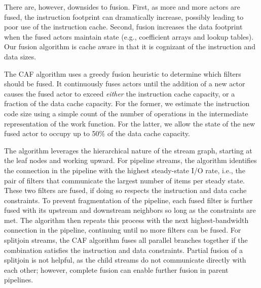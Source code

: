 There are, however, downsides to fusion. First, as more and more
actors are fused, the instruction footprint can dramatically increase,
possibly leading to poor use of the instruction cache. Second, fusion
increases the data footprint when the fused actors maintain state
(e.g., coefficient arrays and lookup tables). Our fusion algorithm is
cache aware in that it is cognizant of the instruction and data sizes.

The CAF algorithm uses a greedy fusion heuristic to determine which
filters should be fused. It continuously fuses actors until the
addition of a new actor causes the fused actor to exceed {\it either}
the instruction cache capacity, or a fraction of the data cache
capacity.  For the former, we estimate the instruction code size using
a simple count of the number of operations in the intermediate
representation of the work function.  For the latter, we allow the
state of the new fused actor to occupy up to 50\% of the data cache
capacity.

The algorithm leverages the hierarchical nature of the stream graph,
starting at the leaf nodes and working upward.  For pipeline streams,
the algorithm identifies the connection in the pipeline with the
highest steady-state I/O rate, i.e., the pair of filters that
communicate the largest number of items per steady state.  These two filters
are fused, if doing so respects the instruction and data cache constraints.
To prevent fragmentation of the pipeline, each fused filter is further
fused with its upstream and downstream neighbors so long as the
constraints are met.  The algorithm then repeats this process with the
next highest-bandwidth connection in the pipeline, continuing until no
more filters can be fused.  For splitjoin streams, the CAF algorithm
fuses all parallel branches together if the combination satisfies the
instruction and data constraints.  Partial fusion of a splitjoin is
not helpful, as the child streams do not communicate directly with
each other; however, complete fusion can enable further fusion in
parent pipelines.


